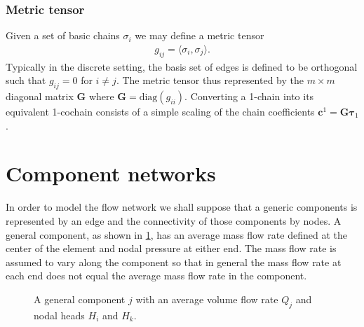 \documentclass[12pt]{article}
\begin{document}
\subsubsection{Metric tensor}

Given a set of basic chains $\sigma_i$ we may define a metric tensor 
\begin{align*}
g_{ij} = \langle \sigma_i, \sigma_j \rangle.
\end{align*}
Typically in the discrete setting, the basis set of edges is defined to be orthogonal such that $g_{ij}=0$ for $i \neq j$. The metric tensor thus represented by the $m \times m$ diagonal matrix $\mathbf{G}$ where $\mathbf{G}=\text{diag}(g_{ii})$. Converting a 1-chain into its equivalent 1-cochain consists of a simple scaling of the chain coefficients $\mathbf{c}^1 = \mathbf{G} \mathbf{\tau}_1$.


\section{Component networks} \label{sec:component_networks}

In order to model the flow network we shall suppose that a generic components is represented by an edge and the connectivity of those components by nodes. A general component, as shown in \ref{fig:transient_element}, has an average mass flow rate defined at the center of the element and nodal pressure at either end. The mass flow rate is assumed to vary along the component so that in general the mass flow rate at each end does not equal the average mass flow rate in the component. 

\begin{figure}
\centering
{} 
\caption{A general component $j$ with an average volume flow rate $Q_j$ and nodal heads $H_i$ and $H_k$.}
\label{fig:transient_element}
\end{figure}
\end{document}
